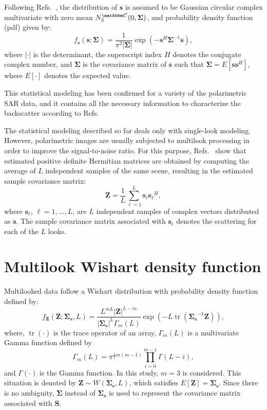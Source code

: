 \documentclass[conference]{IEEEtran}
\DeclareMathOperator{\traco}{tr}
\begin{document}
Following Refs.~\cite{good, lee}, the distribution of $\mathbf{s}$ is assumed to be  Gaussian circular complex multivariate with zero mean $N^{\mathbbm C}_3(0,\mathbf{\Sigma})$, and probability density function (pdf) given by:
\begin{equation}
    f_{\mathbf{s}}(\mathbf{s};\mathbf{\Sigma})=\frac{1}{\pi^3|\mathbf{\Sigma}|} \exp(-\mathbf{s}^H\mathbf{\Sigma}^{-1}\mathbf{s}),
    \label{eq_02}
\end{equation}
where $|\cdot|$ is the determinant, 
the superscript index $H$ denotes the conjugate complex number, 
and $\mathbf{\Sigma}$ is the covariance matrix of $\mathbf{s}$ such that $\mathbf{\Sigma}=E[\mathbf{ss}^H]$, where $E[\cdot]$ denotes the expected value. 

This statistical modeling has been confirmed for a variety of the polarimetric SAR data, and it contains all the necessary information to characterize the backscatter according to Refs.~\cite{sarabendi,mfp}
 
The statistical modeling described so far deals only with single-look modeling.
However, polarimetric images are usually subjected to multilook processing in order to improve the signal-to-noise ratio. 
For this purpose, Refs.~\cite{good, ade} show that estimated positive definite Hermitian matrices are obtained by computing the average of $L$ independent samples of the same scene, resulting in the estimated sample covariance matrix:
\begin{equation}
    \mathbf{Z}=\frac{1}{L}\sum_{\ell=1}^{L} {\mathbf{s}_\ell}{\mathbf{s}_\ell}^H,
    \label{eq_03}
\end{equation}
where $\mathbf{s}_\ell$, $\ell = 1, \dots, L$, are $L$ independent samples of complex vectors distributed as $\mathbf{s}$. 
The sample covariance matrix associated with $\mathbf{s}_\ell$ denotes the scattering for each of the $L$ looks.

\section{Multilook Wishart density function}\label{sec_03}

Multilooked data follow a Wishart distribution with probability density function defined by:
\begin{equation}
    f_{\mathbf{Z}}(\mathbf{Z};\mathbf{\Sigma_{s}},L)=\frac{L^{mL}|\mathbf{Z}|^{L-m}}{|\mathbf{\Sigma_{s}}|^{L}\Gamma_m(L)} \exp(-L\traco(\mathbf{\Sigma_{s}}^{-1}\mathbf{Z})),
    \label{eq_04}
\end{equation} 
where, $\traco(\cdot)$ is the trace operator of an array, $\Gamma_m(L)$ is a multivariate Gamma function defined by
\begin{equation*}
	\Gamma_m(L)=\pi^{\frac{1}{2}m(m-1)} \prod_{i=0}^{m-1}\Gamma(L-i),
\end{equation*}
and $\Gamma(\cdot)$ is the Gamma function.
In this study, $m=3$ is considered. This situation is denoted by $\mathbf{Z}\sim W(\mathbf{\Sigma_{s}}, L)$, which satisfies $E[\mathbf{Z}]=\mathbf{\Sigma_{s}}$. 
Since there is no ambiguity, $\mathbf{\Sigma}$ instead of $\mathbf{\Sigma_{s}}$ is used  to represent the covariance matrix associated with $\mathbf{S}$.
\end{document}
